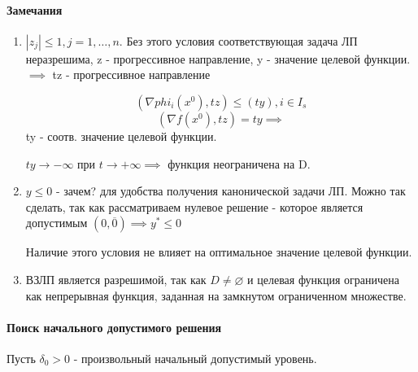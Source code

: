 \documentclass[a4paper]{article}
\theoremstyle{definition}
\theoremstyle{remark}
\begin{document}
\paragraph*{Замечания}
\begin{enumerate}
    \item $|z_j|\le 1, j = 1, \dots, n.$ Без этого условия соответствующая задача ЛП неразрешима, z - прогрессивное направление, y - значение целевой функции. $\implies$ tz - прогрессивное направление 

    \[(\nabla phi_i(x^0), tz) \le (ty), i\in I_s\]
    \[(\nabla f(x^0), tz) = ty\implies\] 
    ty - соотв. значение целевой функции.

    $ty\to -\infty$ при $t \to +\infty\implies$ функция неограничена на D.

    \item $y \le 0$ - зачем? для удобства получения канонической задачи ЛП. Можно так сделать, так как рассматриваем нулевое решение - которое является допустимым $(0, \overline{0})\implies y ^*\le 0$
    
    Наличие этого условия не влияет на оптимальное значение целевой функции.

    \item ВЗЛП является разрешимой, так как $D\neq \varnothing$ и целевая функция ограничена как непрерывная функция, заданная на замкнутом ограниченном множестве.

\end{enumerate}
\paragraph*{Поиск начального допустимого решения}

Пусть $\delta_0 > 0$ - произвольный начальный допустимый уровень.
\end{document}
